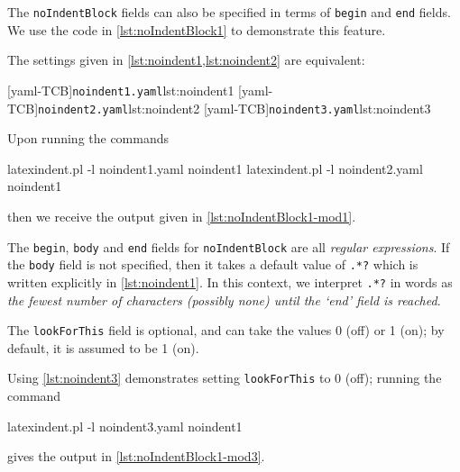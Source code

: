  \begin{example}
 The \texttt{noIndentBlock} fields can also be specified in terms of \texttt{begin} and
 \texttt{end} fields. We use the code in \cref{lst:noIndentBlock1} to demonstrate this
 feature.%


 The settings given in \cref{lst:noindent1,lst:noindent2} are equivalent:

 \begin{cmhtcbraster}[raster columns=3,
   raster left skip=-3.5cm,
   raster right skip=-2cm,
   raster column skip=.03\linewidth]
  [yaml-TCB]{\texttt{noindent1.yaml}}{lst:noindent1}
  [yaml-TCB]{\texttt{noindent2.yaml}}{lst:noindent2}
  [yaml-TCB]{\texttt{noindent3.yaml}}{lst:noindent3}
 \end{cmhtcbraster}

 Upon running the commands

 \begin{commandshell}
latexindent.pl -l noindent1.yaml noindent1
latexindent.pl -l noindent2.yaml noindent1
\end{commandshell}

 then we receive the output given in \cref{lst:noIndentBlock1-mod1}.


 \end{example}

 The \texttt{begin}, \texttt{body} and \texttt{end} fields for \texttt{noIndentBlock} are
 all \emph{regular expressions}. If the \texttt{body} field is not specified, then it
 takes a default value of \lstinline!.*?! which is written explicitly in
 \cref{lst:noindent1}. In this context, we interpret \lstinline!.*?! in words as
 \emph{the fewest number of characters (possibly none) until the `end' field is reached}.

 The \texttt{lookForThis} field is optional, and can take the values 0 (off) or 1 (on);
 by default, it is assumed to be 1 (on).

 \begin{example}
 Using \cref{lst:noindent3} demonstrates setting \texttt{lookForThis} to 0 (off); running
 the command

 \begin{commandshell}
latexindent.pl -l noindent3.yaml noindent1
\end{commandshell}

 gives the output in \cref{lst:noIndentBlock1-mod3}.


 \end{example}

